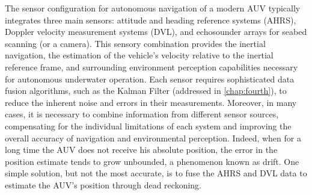 The sensor configuration for autonomous navigation of a modern AUV typically integrates three main sensors: attitude and heading reference 
systems (AHRS), Doppler velocity measurement systems (DVL), and echosounder arrays for seabed scanning (or a camera). This sensory combination provides the 
inertial navigation, the estimation of the vehicle's velocity relative to the inertial 
reference frame, and surrounding environment perception capabilities necessary for autonomous underwater operation. 
Each sensor requires sophisticated data fusion algorithms, such as the Kalman Filter (addressed in \ref{chap:fourth}), to reduce the inherent noise and
errors in their measurements. Moreover, in many cases, it is necessary to combine information from different sensor sources, compensating for the individual 
limitations of each system and improving the overall accuracy of navigation and environmental perception. Indeed, when for a long time the AUV does not receive 
his absolute position, the error in the position estimate tends to grow unbounded, a phenomenon known as drift. One simple solution, but not the most accurate, 
is to fuse the AHRS and DVL data to estimate the AUV's position through dead reckoning.


